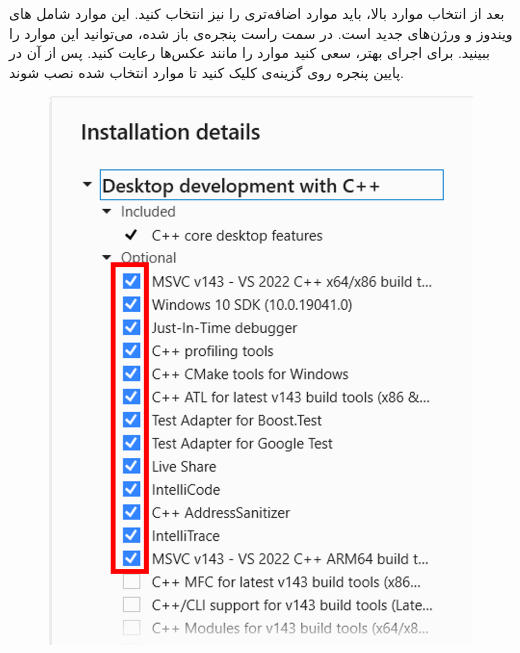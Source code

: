 {    بعد از انتخاب موارد بالا، باید موارد اضافه‌تری را نیز انتخاب کنید. این موارد شامل ‌های ویندوز و ورژن‌های جدید  است.
    در سمت راست پنجره‌ی باز شده، می‌توانید این موارد را ببینید. برای اجرای بهتر، سعی کنید موارد را مانند عکس‌ها رعایت کنید. پس از آن در پایین پنجره روی گزینه‌ی  کلیک کنید تا موارد انتخاب شده نصب شوند.
    \begin{figure}[H]
        \centering
        \setlength{\belowcaptionskip}{-10pt}
        \includegraphics[scale=0.7]{Images/1.Intro.3.1.png} \hspace{5mm}

\end{figure}}
